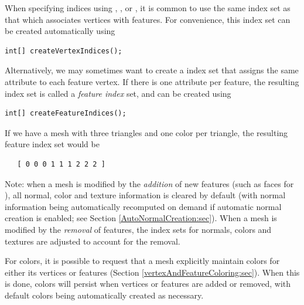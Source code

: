 When specifying indices using 
,
, or
,
it is common to use the same index set as that which
associates vertices with features. For convenience,
this index set can be created automatically using
%
\begin{lstlisting}[]
   int[] createVertexIndices();
\end{lstlisting}
%
Alternatively, we may sometimes want to create a index set
that assigns the same attribute to each feature vertex. If
there is one attribute per feature, the resulting
index set is called a {\it feature index} set, and
can be created using
%
\begin{lstlisting}[]
   int[] createFeatureIndices();
\end{lstlisting}
%
If we have a mesh with three triangles and one color per
triangle, the resulting feature index set would be
%
\begin{verbatim}
   [ 0 0 0 1 1 1 2 2 2 ]
\end{verbatim}
%

\begin{sideblock}
Note: when a mesh is modified by the {\it addition} of new features
(such as faces for ), all
normal, color and texture information is cleared by default (with
normal information being automatically recomputed on demand if
automatic normal creation is enabled; see Section \ref{AutoNormalCreation:sec}).
When a mesh is modified by the {\it removal} of
features, the index sets for normals, colors and textures are adjusted
to account for the removal.

For colors, it is possible to request that a mesh explicitly maintain
colors for either its vertices or features (Section
\ref{vertexAndFeatureColoring:sec}). When this is done, colors will
persist when vertices or features are added or removed, with default
colors being automatically created as necessary.
\end{sideblock}

